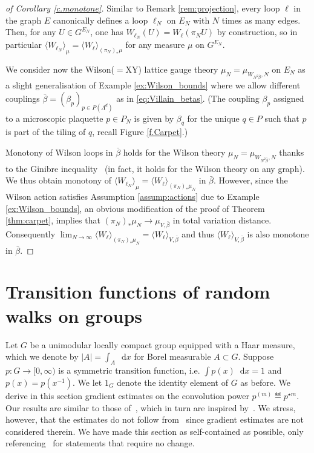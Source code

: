 \documentclass[11pt]{preprint}
\def\scal#1{{\langle#1\rangle}}
\newcommand{\mrd}{\mathop{}\!\mathrm{d}}
\begin{document}
\begin{proof}[of Corollary \ref{c.monotone}]
Similar to Remark \ref{rem:projection}, every loop $\ell$ in the graph $E$ canonically defines a loop $\ell_N$ on $E_N$ with $N$ times as many edges.
Then, for any $U\in G^{E_N}$, one has $W_{\ell_N}(U) = W_\ell(\pi_N U)$ by construction,
so in particular $\scal{W_{\ell_N}}_\mu = \scal{W_\ell}_{(\pi_N)_*\mu}$ for any measure $\mu$ on $G^{E_N}$.

We consider now the Wilson($=$XY) lattice gauge theory $\mu_N = \mu_{W_{N^2\bar\beta},N}$ on $E_N$ as a slight generalisation of Example \ref{ex:Wilson_bounds} where we allow different couplings $\bar\beta = (\beta_p)_{p\in P(\Lambda^d)}$ as in \eqref{eq:Villain_betas}.
(The coupling $\beta_p$ assigned to a microscopic plaquette $p\in P_N$ is given by $\beta_q$ for the unique $q\in P$ such that $p$ is part of the tiling of $q$, recall Figure \ref{f.Carpet}.)

Monotony of Wilson loops in $\bar\beta$ holds for the Wilson theory $\mu_N = \mu_{W_{N^2\bar\beta},N}$ thanks to the Ginibre inequality~\cite{ginibre1970general} (in fact, it holds for the Wilson theory on any graph).
We thus obtain monotony of $\scal{W_{\ell_N}}_\mu=\scal{W_\ell}_{(\pi_N)_*\mu_N}$ in $\bar\beta$.
However, since the Wilson action satisfies Assumption \ref{assump:actions} due to Example \ref{ex:Wilson_bounds},
an obvious modification of the proof of Theorem \ref{thm:carpet},
implies that $(\pi_N)_*\mu_N \to \mu_{V,\bar\beta}$ in total variation distance.
Consequently $\lim_{N\to\infty}\scal{W_\ell}_{(\pi_N)_*\mu_N} = \scal{W_\ell}_{V,\bar\beta}$
and thus $\scal{W_\ell}_{V,\bar\beta}$ is also monotone in $\bar\beta$.
\end{proof}

\section{Transition functions of random walks on groups}
\label{sec:transition}

Let $G$ be a unimodular locally compact group equipped with a Haar measure, which we denote by $|A| = \int_A \mrd x$ for Borel measurable $A\subset G$.
Suppose $p \colon G\to [0,\infty)$ is a symmetric transition function, i.e. $\int p(x)\mrd x = 1$ and $p(x)=p(x^{-1})$.
We let $1_G$ denote the identity element of $G$ as before.
We derive in this section gradient estimates on the convolution power $p^{(m)} \eqdef p^{\star m}$.
Our results are similar to those of~\cite[Appendix~C]{CS23}, which in turn are inspired by~\cite{Hebisch_Saloff_Coste_93}.
We stress, however, that the estimates do not follow from~\cite{CS23} since gradient estimates are not considered therein.
We have made this section as self-contained as possible, only referencing~\cite{Hebisch_Saloff_Coste_93,CS23} for statements that require no change.
\end{document}
